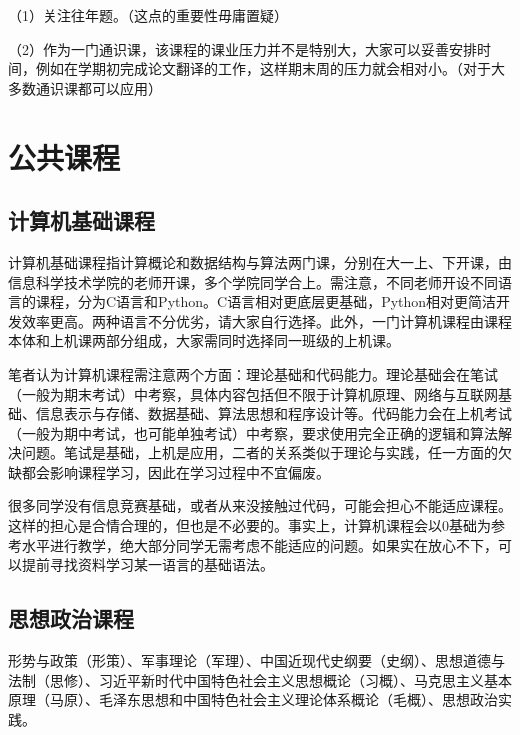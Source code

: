 \documentclass[11pt,oneside]{book}
\begin{document}
（1）关注往年题。（这点的重要性毋庸置疑）

（2）作为一门通识课，该课程的课业压力并不是特别大，大家可以妥善安排时间，例如在学期初完成论文翻译的工作，这样期末周的压力就会相对小。（对于大多数通识课都可以应用）


\section{公共课程}

\subsection{计算机基础课程}

计算机基础课程指计算概论和数据结构与算法两门课，分别在大一上、下开课，由信息科学技术学院的老师开课，多个学院同学合上。需注意，不同老师开设不同语言的课程，分为C语言和Python。C语言相对更底层更基础，Python相对更简洁开发效率更高。两种语言不分优劣，请大家自行选择。此外，一门计算机课程由课程本体和上机课两部分组成，大家需同时选择同一班级的上机课。

\vspace{20pt}

笔者认为计算机课程需注意两个方面：理论基础和代码能力。理论基础会在笔试（一般为期末考试）中考察，具体内容包括但不限于计算机原理、网络与互联网基础、信息表示与存储、数据基础、算法思想和程序设计等。代码能力会在上机考试（一般为期中考试，也可能单独考试）中考察，要求使用完全正确的逻辑和算法解决问题。笔试是基础，上机是应用，二者的关系类似于理论与实践，任一方面的欠缺都会影响课程学习，因此在学习过程中不宜偏废。

\vspace{20pt}

很多同学没有信息竞赛基础，或者从来没接触过代码，可能会担心不能适应课程。这样的担心是合情合理的，但也是不必要的。事实上，计算机课程会以0基础为参考水平进行教学，绝大部分同学无需考虑不能适应的问题。如果实在放心不下，可以提前寻找资料学习某一语言的基础语法。

\subsection{思想政治课程}
形势与政策（形策）、军事理论（军理）、中国近现代史纲要（史纲）、思想道德与法制（思修）、习近平新时代中国特色社会主义思想概论（习概）、马克思主义基本原理（马原）、毛泽东思想和中国特色社会主义理论体系概论（毛概）、思想政治实践。

\vspace{20pt}
\end{document}
